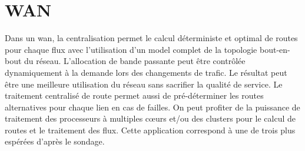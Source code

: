 



\section{WAN}
Dans un \gls{wan}, la centralisation permet le calcul déterministe et optimal de routes pour chaque flux avec l'utilisation d'un model complet de la topologie bout-en-bout du réseau. L'allocation de bande passante peut être contrôlée dynamiquement à la demande lors des changements de trafic. Le résultat peut être une meilleure utilisation du réseau sans sacrifier la qualité de service. Le traitement centralisé de route permet aussi de pré-déterminer les routes alternatives pour chaque lien en cas de failles. On peut profiter de la puissance de traitement des processeurs à multiples cœurs et/ou des \glspl{cluster} pour le calcul de routes et le traitement des flux. Cette application correspond à une de trois plus espérées d'après le sondage. \cite{2013GuideSDNNVUseCases}





